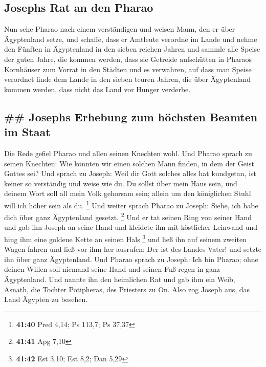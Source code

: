 \hypertarget{josephs-rat-an-den-pharao}{%
\subsection{Josephs Rat an den Pharao}\label{josephs-rat-an-den-pharao}}

 Nun sehe Pharao nach einem verständigen und weisen Mann,
den er über Ägyptenland setze,  und schaffe, dass er
Amtleute verordne im Lande und nehme den Fünften in Ägyptenland in den
sieben reichen Jahren  und sammle alle Speise der guten
Jahre, die kommen werden, dass sie Getreide aufschütten in Pharaos
Kornhäuser zum Vorrat in den Städten und es verwahren, 
auf dass man Speise verordnet finde dem Lande in den sieben teuren
Jahren, die über Ägyptenland kommen werden, dass nicht das Land vor
Hunger verderbe.

\hypertarget{josephs-erhebung-zum-huxf6chsten-beamten-im-staat}{%
\subsection{\#\# Josephs Erhebung zum höchsten Beamten im
Staat}\label{josephs-erhebung-zum-huxf6chsten-beamten-im-staat}}

 Die Rede gefiel Pharao und allen seinen Knechten wohl.
 Und Pharao sprach zu seinen Knechten: Wie könnten wir
einen solchen Mann finden, in dem der Geist Gottes sei? 
Und sprach zu Joseph: Weil dir Gott solches alles hat kundgetan, ist
keiner so verständig und weise wie du.  Du sollst über
mein Haus sein, und deinem Wort soll all mein Volk gehorsam sein; allein
um den königlichen Stuhl will ich höher sein als du. \footnote{\textbf{41:40}
  Pred 4,14; Ps 113,7; Ps 37,37}  Und weiter sprach
Pharao zu Joseph: Siehe, ich habe dich über ganz Ägyptenland gesetzt.
\footnote{\textbf{41:41} Apg 7,10}  Und er tat seinen
Ring von seiner Hand und gab ihn Joseph an seine Hand und kleidete ihn
mit köstlicher Leinwand und hing ihm eine goldene Kette an seinen Hals
\footnote{\textbf{41:42} Est 3,10; Est 8,2; Dan 5,29} 
und ließ ihn auf seinem zweiten Wagen fahren und ließ vor ihm her
ausrufen: Der ist des Landes Vater! und setzte ihn über ganz
Ägyptenland.  Und Pharao sprach zu Joseph: Ich bin
Pharao; ohne deinen Willen soll niemand seine Hand und seinen Fuß regen
in ganz Ägyptenland.  Und nannte ihn den heimlichen Rat
und gab ihm ein Weib, Asnath, die Tochter Potipheras, des Priesters zu
On. Also zog Joseph aus, das Land Ägypten zu besehen.

